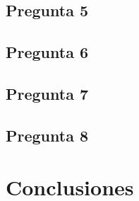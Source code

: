 \documentclass[letter,10pt]{article}
\begin{document}
\subsection{Pregunta 5}
\subsection{Pregunta 6}
\subsection{Pregunta 7}
\subsection{Pregunta 8}




\section{Conclusiones}




%
%

\end{document}
